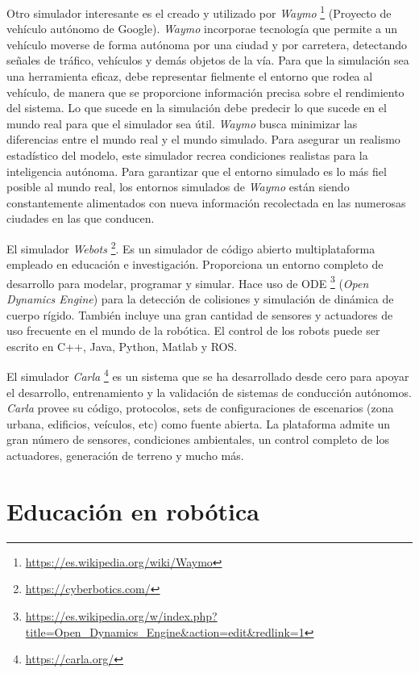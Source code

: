 \documentclass[a4paper, 12pt]{book}
\begin{document}
Otro simulador interesante es el creado y utilizado por \emph{Waymo} \footnote{\url{https://es.wikipedia.org/wiki/Waymo}} (Proyecto de vehículo autónomo de Google). \emph{Waymo} incorporae tecnología que permite a un vehículo moverse de forma autónoma por una ciudad y por carretera, detectando señales de tráfico, vehículos y demás objetos de la vía. Para que la simulación sea una herramienta eficaz, debe representar fielmente el entorno que rodea al vehículo, de manera que se proporcione información precisa sobre el rendimiento del sistema. Lo que sucede en la simulación debe predecir lo que sucede en el mundo real para que el simulador sea útil. \emph{Waymo} busca minimizar las diferencias entre el mundo real y el mundo simulado. Para asegurar un realismo estadístico del modelo, este simulador recrea condiciones realistas para la inteligencia autónoma. Para garantizar que el entorno simulado es lo más fiel posible al mundo real, los entornos simulados de  \emph{Waymo} están siendo constantemente alimentados con nueva información recolectada en las numerosas ciudades en las que conducen.

El simulador \emph{Webots} \footnote{\url{https://cyberbotics.com/}}. Es un simulador de código abierto multiplataforma empleado en educación e investigación. Proporciona un entorno completo de desarrollo para modelar, programar y simular. Hace uso de ODE \footnote{\url{https://es.wikipedia.org/w/index.php?title=Open_Dynamics_Engine&action=edit&redlink=1}} (\emph{Open Dynamics Engine}) para la detección de colisiones y simulación de dinámica de cuerpo rígido. También incluye una gran cantidad de sensores y actuadores de uso frecuente en el mundo de la robótica. El control de los robots puede ser escrito en C++, Java, Python, Matlab y ROS.

El simulador \emph{Carla} \footnote{\url{https://carla.org/}} es un sistema que se ha desarrollado desde cero para apoyar el desarrollo, entrenamiento y la validación de sistemas de conducción autónomos. \emph{Carla} provee su código, protocolos, sets de configuraciones de escenarios (zona urbana, edificios, veículos, etc) como fuente abierta. La plataforma admite un gran número de sensores, condiciones ambientales, un control completo de los actuadores, generación de terreno y mucho más.



\section{Educación en robótica}
\label{sec:educacion_robotica}
\end{document}
